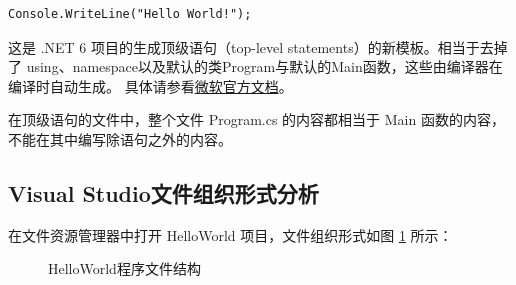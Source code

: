 \begin{lstlisting}
Console.WriteLine("Hello World!");
\end{lstlisting}

这是 .NET 6 项目的生成顶级语句（top-level statements）的新模板。相当于去掉了
using、namespace以及默认的类Program与默认的Main函数，这些由编译器在编译时自动生成。
具体请参看\href{https://docs.microsoft.com/en-us/dotnet/core/tutorials/top-level-templates}{微软官方文档}。

在顶级语句的文件中，整个文件 Program.cs 的内容都相当于 Main 函数的内容，不能在其中编写除语句之外的内容。

\subsection{Visual Studio文件组织形式分析}

在文件资源管理器中打开 HelloWorld 项目，文件组织形式如图 \ref{fig:HelloWorldProj} 所示：

\begin{figure}[htbp]
\centering
{}
\hspace{20pt}%
\caption{HelloWorld程序文件结构}
\label{fig:HelloWorldProj}
\end{figure}

